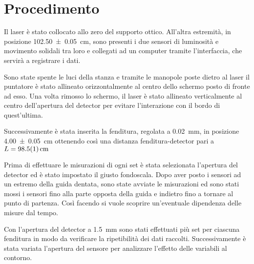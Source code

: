 \documentclass[../main.tex]{subfiles}
\begin{document}
\section{Procedimento}

Il laser è stato collocato allo zero del supporto ottico. All’altra estremità, in posizione \qty{102.50+-0.05}{\cm}, sono presenti i due sensori di luminosità e movimento solidali tra loro e collegati ad un computer tramite l’interfaccia, che servirà a registrare i dati.

Sono state spente le luci della stanza e tramite le manopole poste dietro al laser il puntatore è stato allineato orizzontalmente al centro dello schermo posto di fronte ad esso. Una volta rimosso lo schermo, il laser è stato allineato verticalmente al centro dell'apertura del detector per evitare l'interazione con il bordo di quest'ultima.

Successivamente è stata inserita la fenditura, regolata a \qty{0.02}{\milli\meter}, in posizione \qty{4.00+-0.05}{\cm} ottenendo così una distanza fenditura-detector pari a $L = \qty{98.5+-0.1}{\cm}$

Prima di effettuare le misurazioni di ogni set è stata selezionata l'apertura del detector ed è stato impostato il giusto fondoscala. Dopo aver posto i sensori ad un estremo della guida dentata, sono state avviate le misurazioni ed sono stati mossi i sensori fino alla parte opposta della guida e indietro fino a tornare al punto di partenza. Così facendo si vuole scoprire un'eventuale dipendenza delle misure dal tempo.

Con l'apertura del detector a \qty{1.5}{\milli\meter} sono stati effettuati più set per ciascuna fenditura in modo da verificare la ripetibilità dei dati raccolti. Successivamente è stata variata l'apertura del sensore per analizzare l'effetto delle variabili al contorno.
\end{document}
